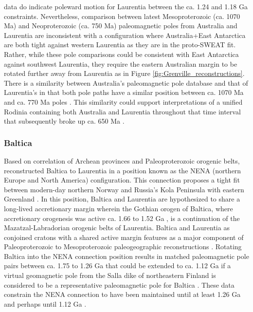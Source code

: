 \documentclass[twocolumn, switch]{article} %
\begin{document}
data do indicate poleward motion for Laurentia between the ca. 1.24 and 1.18 Ga constraints. Nevertheless, comparison between latest Mesoproterozoic (ca. 1070 Ma) and Neoproterozoic (ca. 750 Ma) paleomagnetic poles from Australia and Laurentia are inconsistent with a configuration where Australia+East Antarctica are both tight against western Laurentia as they are in the proto-SWEAT fit. Rather, while these pole comparisons could be consistent with East Antarctica against southwest Laurentia, they require the eastern Australian margin to be rotated further away from Laurentia as in Figure \ref{fig:Grenville_reconstructions}. There is a similarity between Australia's paleomagnetic pole database and that of Laurentia's in that both pole paths have a similar position between ca. 1070 Ma and ca. 770 Ma poles \citep{Swanson-Hysell2012a}. This similarity could support interpretations of a unified Rodinia containing both Australia and Laurentia throughout that time interval \citep{Swanson-Hysell2012a} that subsequently broke up ca. 650 Ma \citep{Li2011a}.

\subsubsection{Baltica}

Based on correlation of Archean provinces and Paleoproterozoic orogenic belts, \cite{Gower1990a} reconstructed Baltica to Laurentia in a position known as the NENA (northern Europe and North America) configuration. This connection proposes a tight fit between modern-day northern Norway and Russia's Kola Peninsula with eastern Greenland \citep{Gower1990a, Salminen2021b}. In this position, Baltica and Laurentia are hypothesized to share a long-lived accretionary margin wherein the Gothian orogen of Baltica, where accretionary orogenesis was active ca. 1.66 to 1.52 Ga \citep{Bergstrom2020a}, is a continuation of the Mazatzal-Labradorian orogenic belts of Laurentia\citep{Karlstrom2001a}. Baltica and Laurentia as conjoined cratons with a shared active margin features as a major component of Paleoproterozoic to Mesoproterozoic paleogeographic reconstructions \citep{Evans2011a, Zhang2012a, Elming2021a}. Rotating Baltica into the NENA connection position results in matched paleomagnetic pole pairs between ca. 1.75 to 1.26 Ga \citep{Buchan2000a, Evans2008a} that could be extended to ca. 1.12 Ga if a virtual geomagnetic pole from the Salla dike of northeastern Finland is considered to be a representative paleomagnetic pole for Baltica \citep{Salminen2009b}. These data constrain the NENA connection to have been maintained until at least 1.26 Ga and perhaps until 1.12 Ga \citep{Salminen2021b}. 
\end{document}
